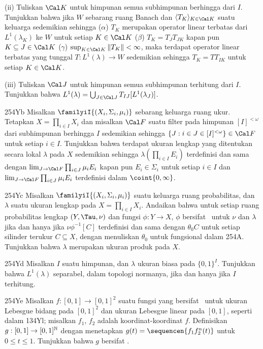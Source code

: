 {\quad (ii) Tuliskan $\Cal K$ untuk himpunan semua subhimpunan berhingga dari $I$. Tunjukkan
bahwa jika $W$ sebarang ruang Banach dan $\langle T_K\rangle_{K\in\Cal K}$
suatu keluarga sedemikian sehingga ($\alpha$) $T_K$ merupakan operator linear terbatas dari
$L^1(\lambda_K)$ ke $W$ untuk setiap $K\in\Cal K$ ($\beta$)
$T_K=T_JT_{JK}$ kapan pun $K\subseteq J\in \Cal K$ ($\gamma$)
$\sup_{K\in\Cal K}\|T_K\|<\infty$, maka terdapat operator linear terbatas yang tunggal
$T:L^1(\lambda)\to W$ sedemikian sehingga $T_K=TT_{IK}$ untuk setiap
$K\in\Cal K$.

\quad (iii) Tuliskan $\Cal J$ untuk himpunan semua subhimpunan terhitung dari $I$.
Tunjukkan bahwa $L^1(\lambda)=\bigcup_{J\in\Cal J}T_{IJ}[L^1(\lambda_J)]$.

\spheader 254Yb Misalkan $\familyiI{(X_i,\Sigma_i,\mu_i)}$
sebarang keluarga ruang ukur.
Tetapkan $X=\prod_{i\in I}X_i$ dan misalkan $\Cal F$ suatu filter pada
himpunan $[I]^{<\omega}$ dari subhimpunan berhingga $I$ sedemikian sehingga
$\{J:i\in J\in[I]^{<\omega}\}\in\Cal F$ untuk setiap $i\in I$. Tunjukkan bahwa
terdapat ukuran lengkap yang ditentukan secara lokal
$\lambda$ pada $X$ sedemikian sehingga $\lambda(\prod_{i\in I}E_i)$
terdefinisi dan sama dengan $\lim_{J\to\Cal F}\prod_{i\in J}\mu_iE_i$ kapan pun
$E_i\in\Sigma_i$ untuk setiap $i\in I$ dan
$\lim_{J\to\Cal F}\prod_{i\in J}\mu_iE_i$ terdefinisi dalam
$\coint{0,\infty}$.

\spheader 254Yc
Misalkan $\familyiI{(X_i,\Sigma_i,\mu_i)}$ suatu keluarga ruang probabilitas,
dan $\lambda$ suatu ukuran lengkap pada $X=\prod_{i\in I}X_i$.
Andaikan bahwa untuk setiap ruang probabilitas lengkap $(Y,\Tau,\nu)$ dan
fungsi
$\phi:Y\to X$, $\phi$ bersifat \imp\ untuk $\nu$ dan $\lambda$ jika dan hanya jika
$\nu\phi^{-1}[C]$ terdefinisi dan
sama dengan $\theta_0 C$ untuk setiap silinder terukur $C\subseteq X$,
dengan menuliskan $\theta_0$ untuk fungsional dalam 254A. Tunjukkan bahwa
$\lambda$ merupakan ukuran produk pada $X$.

\spheader 254Yd Misalkan $I$ suatu himpunan, dan $\lambda$ ukuran biasa
pada $\{0,1\}^I$. Tunjukkan bahwa $L^1(\lambda)$ separabel, dalam
topologi normanya, jika dan hanya jika $I$ terhitung.

\spheader 254Ye Misalkan $f:[0,1]\to[0,1]^2$ suatu fungsi
yang bersifat \imp\ untuk ukuran Lebesgue bidang pada $[0,1]^2$ dan
ukuran Lebesgue linear pada $[0,1]$, seperti dalam 134Yl; misalkan $f_1$, $f_2$ adalah
koordinat-koordinat $f$. Definisikan $g:[0,1]\to[0,1]^{\Bbb N}$ dengan menetapkan
$g(t)=\sequencen{f_1f_2^n(t)}$ untuk $0\le t\le 1$. Tunjukkan bahwa $g$ bersifat
\imp. 

}
